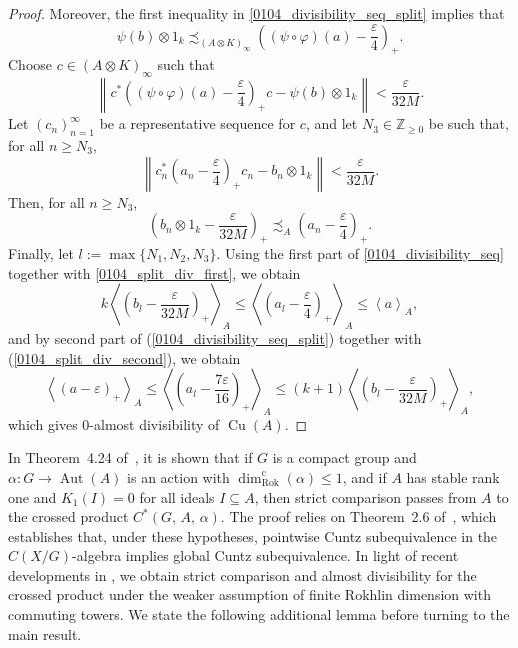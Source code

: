 \documentclass[10pt]{amsart}
\numberwithin{equation}{section}
\theoremstyle{definition}
\newcommand{\af}{\alpha}
\newcommand{\ep}{\varepsilon}
\newcommand{\ph}{\varphi}
\newcommand{\ps}{\psi}
\newcommand{\Nz}{{\mathbb{Z}}_{\geq 0}}
\newcommand{\Aut}{{\operatorname{Aut}}}
\newcommand{\Cu}{{\operatorname{Cu}}}
\newcommand{\inn}[1]{\left\langle #1 \right\rangle}
\newcommand{\RD}{{\operatorname{dim}}_{\operatorname{Rok}}^{\operatorname{c}}}
\begin{document}
\begin{proof}
Moreover, the first inequality in \eqref{0104_divisibility_seq_split} implies that
\begin{equation*}
\ps(b) \otimes 1_{k} \precsim_{(A\otimes K)_\infty} \left( (\ps \circ \ph) (a) -\frac{ \ep}{4}\right)_+.
\end{equation*}
Choose $c\in (A\otimes K)_\infty$ such that
\begin{equation*}
\left\| c^* \left((\ps\circ \ph)(a)-\frac{\ep}{4}\right)_+ c - \ps(b) \otimes 1_k\right\| < \frac{\ep}{32 M}.
\end{equation*}
Let $(c_n)_{n=1}^\infty$ be a representative sequence for $c$, and let $N_3\in \Nz$ be such that, for all $n\geq N_3$,
\begin{equation}
\left\|c_n^* \left(a_n - \frac{\ep}{4}\right)_+ c_n - b_n \otimes 1_{k}\right\| <\frac{\ep}{32M}.
\end{equation}
Then, for all $n\geq N_3$,
\begin{equation}\label{0104_split_div_first}
\left(b_n \otimes 1_k -\frac{\ep}{32 M}\right)_+ \precsim_A \left( a_n -\frac{\ep}{4}\right)_+.
\end{equation}
Finally, let $l:= \max \{N_1, N_2, N_3\}$. Using the first part of \eqref{0104_divisibility_seq} together with \eqref{0104_split_div_first}, we obtain
\[
k\inn{\left(b_l - \frac{\ep}{32 M}\right)_+}_A \leq \inn{\left( a_l- \frac{\ep}{4} \right)_+}_A \leq  \inn{a}_A,
\]
and by second part of (\ref{0104_divisibility_seq_split}) together with (\ref{0104_split_div_second}), we obtain
\[
\inn{(a- \ep)_+ }_A \leq \inn{\left(a_l -\frac{7\ep}{16}\right)_+}_A \leq (k+1) \inn{\left(b_l -\frac{\ep}{32 M}\right)_+}_A,
\]
which gives $0$-almost divisibility of $\Cu(A)$.
\end{proof}

In Theorem~4.24 of~\cite{GdlHrbStg},
it is shown that if $G$ is a compact group
and $\alpha \colon G \to \Aut(A)$ is an action with $\RD(\alpha) \leq 1$,
and if $A$ has stable rank one and $K_1(I) = 0$
for all ideals $I \subseteq A$,
then strict comparison passes from $A$ to the crossed product
$C^* ( G, \, A, \, \af )$.
The proof relies on Theorem~2.6 of~\cite{AnBoPe}, which establishes that, under these hypotheses, pointwise Cuntz subequivalence in the $C(X/G)$-algebra implies global Cuntz subequivalence. In light of recent developments in \cite{SethVil}, we obtain strict comparison and almost divisibility for the crossed product under the weaker assumption of finite Rokhlin dimension with commuting towers.
We state the following additional lemma before turning to the main result.
\end{document}

